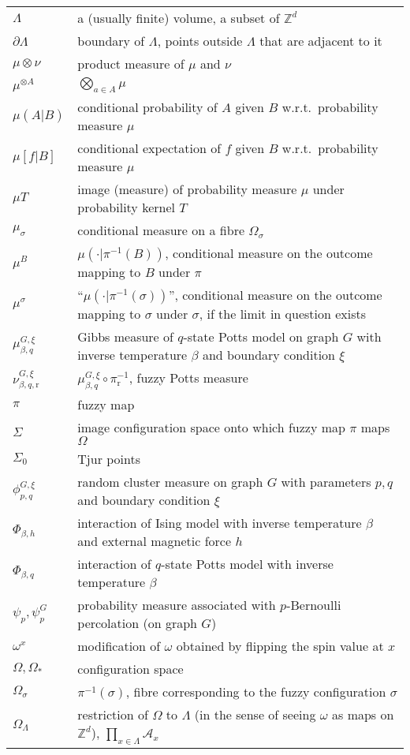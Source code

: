 \documentclass[12pt]{article}
\newcommand{\A}{\mathcal{A}}
\renewcommand{\r}{\mathrm{r}}
\newcommand{\Z}{\mathbb{Z}}
\newcommand{\pika}{\boldsymbol{\cdot}}
\newcommand{\1}{\mathbbm{1}}
\newcommand{\5}{\vspace{0.5cm}}
\theoremstyle{definition}
\begin{document}
\begin{tabular}{p{4cm}p{10cm}}
$\Lambda$ & a (usually finite) volume, a subset of $\Z^d$ \\
$\partial\Lambda$ & boundary of $\Lambda$, points outside $\Lambda$ that are adjacent to it \\
$\mu\otimes\nu$ & product measure of $\mu$ and $\nu$ \\
$\mu^{\otimes A}$ & $\bigotimes_{a\in A}\mu$ \\
$\mu(A|B)$ & conditional probability of $A$ given $B$ w.r.t.~probability measure $\mu$ \\
$\mu[f|B]$ & conditional expectation of $f$ given $B$ w.r.t.~probability measure $\mu$ \\
$\mu T$ & image (measure) of probability measure $\mu$ under probability kernel $T$ \\
$\mu_\sigma$ & conditional measure on a fibre $\Omega_\sigma$ \\
$\mu^B$ & $\mu(\pika|\pi^{-1}(B))$, conditional measure on the outcome mapping to $B$ under $\pi$ \\
$\mu^\sigma$ & ``$\mu(\pika|\pi^{-1}(\sigma))$'', conditional measure on the outcome mapping to $\sigma$ under $\sigma$, if the limit in question exists \\
$\mu_{\beta,q}^{G,\xi}$ & Gibbs measure of $q$-state Potts model on graph $G$ with inverse temperature $\beta$ and boundary condition $\xi$ \\
$\nu_{\beta,q,\r}^{G,\xi}$ & $\mu_{\beta,q}^{G,\xi}\circ\pi_\r^{-1}$, fuzzy Potts measure \\
$\pi$ & fuzzy map \\
$\Sigma$ & image configuration space onto which fuzzy map $\pi$ maps $\Omega$ \\
$\Sigma_0$ & Tjur points \\
$\phi_{p,q}^{G,\xi}$ & random cluster measure on graph $G$ with parameters $p,q$ and boundary condition $\xi$ \\
$\Phi_{\beta,h}$ & interaction of Ising model with inverse temperature $\beta$ and external magnetic force $h$ \\
$\Phi_{\beta,q}$ & interaction of $q$-state Potts model with inverse temperature $\beta$ \\
$\psi_p,\psi_p^G$ & probability measure associated with $p$-Bernoulli percolation (on graph $G$) \\
$\omega^x$ & modification of $\omega$ obtained by flipping the spin value at $x$ \\ 
$\Omega,\Omega_*$ & configuration space \\
$\Omega_\sigma$ & $\pi^{-1}(\sigma)$, fibre corresponding to the fuzzy configuration $\sigma$ \\
$\Omega_\Lambda$ & restriction of $\Omega$ to $\Lambda$ (in the sense of seeing $\omega$ as maps on $\Z^d$), $\prod_{x\in\Lambda}\A_x$
\end{tabular}
\end{document}
